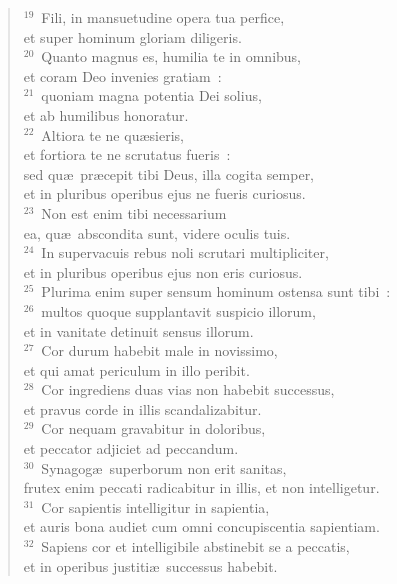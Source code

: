 \begin{verse}${}^{19}$~Fili, in mansuetudine opera tua perfice,\\ et super hominum gloriam diligeris.\\
${}^{20}$~Quanto magnus es, humilia te in omnibus,\\ et coram Deo invenies gratiam~:\\
${}^{21}$~quoniam magna potentia Dei solius,\\ et ab humilibus honoratur.\\
${}^{22}$~Altiora te ne qu\ae sieris,\\ et fortiora te ne scrutatus fueris~:\\ sed qu\ae\ pr\ae cepit tibi Deus, illa cogita semper,\\ et in pluribus operibus ejus ne fueris curiosus.\\
${}^{23}$~Non est enim tibi necessarium\\ ea, qu\ae\ abscondita sunt, videre oculis tuis.\\
${}^{24}$~In supervacuis rebus noli scrutari multipliciter,\\ et in pluribus operibus ejus non eris curiosus.\\
${}^{25}$~Plurima enim super sensum hominum ostensa sunt tibi~:\\
${}^{26}$~multos quoque supplantavit suspicio illorum,\\ et in vanitate detinuit sensus illorum.\\
${}^{27}$~Cor durum habebit male in novissimo,\\ et qui amat periculum in illo peribit.\\
${}^{28}$~Cor ingrediens duas vias non habebit successus,\\ et pravus corde in illis scandalizabitur.\\
${}^{29}$~Cor nequam gravabitur in doloribus,\\ et peccator adjiciet ad peccandum.\\
${}^{30}$~Synagog\ae\ superborum non erit sanitas,\\ frutex enim peccati radicabitur in illis, et non intelligetur.\\
${}^{31}$~Cor sapientis intelligitur in sapientia,\\ et auris bona audiet cum omni concupiscentia sapientiam.\\
${}^{32}$~Sapiens cor et intelligibile abstinebit se a peccatis,\\ et in operibus justiti\ae\ successus habebit.\end{verse}


